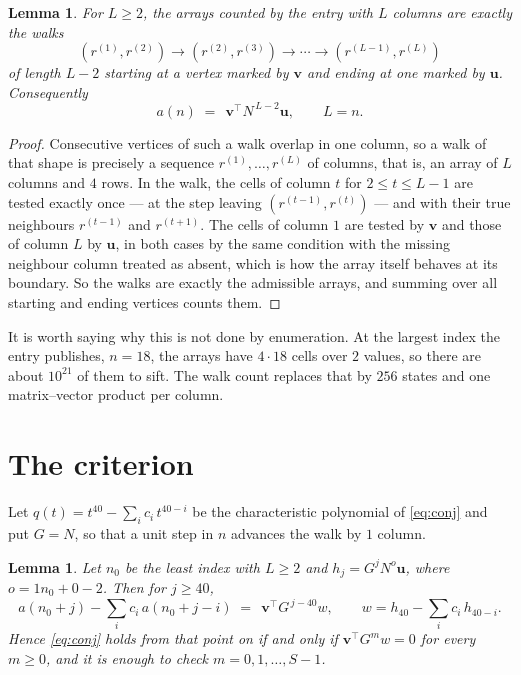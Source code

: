 \documentclass[11pt,a4paper]{article}
\theoremstyle{plain}
\newtheorem{lemma}[theorem]{Lemma}
\theoremstyle{definition}
\begin{document}
\begin{lemma}\label{lem:walk}
For $L\ge2$, the arrays counted by the entry with $L$ columns are exactly the walks
\[
(r^{(1)},r^{(2)})\to(r^{(2)},r^{(3)})\to\cdots\to(r^{(L-1)},r^{(L)})
\]
of length $L-2$ starting at a vertex marked by $\mathbf{v}$ and ending at one marked by
$\mathbf{u}$. Consequently
\[
a(n)\;=\;\,\mathbf{v}^{\!\top}N^{\,L-2}\mathbf{u},\qquad L=n .
\]
\end{lemma}

\begin{proof}
Consecutive vertices of such a walk overlap in one column, so a walk of that shape is
precisely a sequence $r^{(1)},\dots,r^{(L)}$ of columns, that is, an array of $L$ columns
and $4$ rows. In the walk, the cells of column $t$ for $2\le t\le L-1$ are tested
exactly once --- at the step leaving $(r^{(t-1)},r^{(t)})$ --- and with their true
neighbours $r^{(t-1)}$ and $r^{(t+1)}$. The cells of column $1$ are tested by
$\mathbf{v}$ and those of column $L$ by $\mathbf{u}$, in both cases by the same condition
with the missing neighbour column treated as absent, which is how the array itself behaves at
its boundary. So the walks are exactly the admissible arrays, and summing over all starting
and ending vertices counts them.
\end{proof}


It is worth saying why this is not done by enumeration. At the largest index the entry
publishes, $n=18$, the arrays have $4\cdot18$ cells over
$2$ values, so there are about $10^{21}$ of them to sift. The
walk count replaces that by $256$ states and one matrix--vector product per column.
\section{The criterion}

Let $q(t)=t^{40}-\sum_i c_i\,t^{40-i}$ be the characteristic polynomial of
\eqref{eq:conj} and put $G=N$, so that a unit step in $n$ advances the walk by
$1$ column.

\begin{lemma}\label{lem:crit}
Let $n_0$ be the least index with $L\ge2$ and $h_j=G^{j}N^{o}\mathbf{u}$, where
$o=1n_0+0-2$. Then for $j\ge40$,
\[
a(n_0+j)-\sum_i c_i\,a(n_0+j-i)\;=\;\,\mathbf{v}^{\!\top}G^{\,j-40}w,
\qquad w=h_{40}-\sum_i c_i\,h_{40-i} .
\]
Hence \eqref{eq:conj} holds from that point on if and only if
$\mathbf{v}^{\!\top}G^{m}w=0$ for every $m\ge0$, and it is enough to check
$m=0,1,\dots,S-1$.
\end{lemma}
\end{document}
